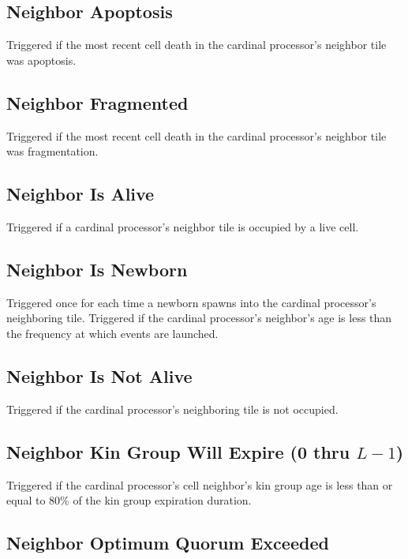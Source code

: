 \subsection{Neighbor Apoptosis}

Triggered if the most recent cell death in the cardinal processor's neighbor tile was apoptosis.

\subsection{Neighbor Fragmented}

Triggered if the most recent cell death in the cardinal processor's neighbor tile was fragmentation.

\subsection{Neighbor Is Alive}

Triggered if a cardinal processor's neighbor tile is occupied by a live cell.

\subsection{Neighbor Is Newborn}

Triggered once for each time a newborn spawns into the cardinal processor's neighboring tile.
Triggered if the cardinal processor's neighbor's age is less than the frequency at which events are launched.

\subsection{Neighbor Is Not Alive}

Triggered if the cardinal processor's neighboring tile is not occupied.

\subsection{Neighbor Kin Group Will Expire (0 thru $L-1$)}

Triggered if the cardinal processor's cell neighbor's kin group age is less than or equal to 80\% of the kin group expiration duration.

\subsection{Neighbor Optimum Quorum Exceeded}

